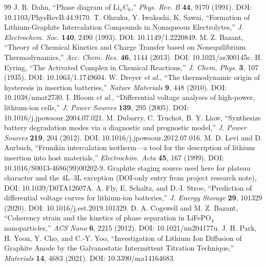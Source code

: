 \documentclass[11pt,a4paper]{article}
\begin{document}
\begin{thebibliography}{99}
 J. R. Dahn, ``Phase diagram of Li$_x$C$_6$,'' \emph{Phys. Rev. B} \textbf{44}, 9170 (1991). DOI: 10.1103/PhysRevB.44.9170.
 T. Ohzuku, Y. Iwakoshi, K. Sawai, ``Formation of Lithium-Graphite Intercalation Compounds in Nonaqueous Electrolytes,'' \emph{J. Electrochem. Soc.} \textbf{140}, 2490 (1993). DOI: 10.1149/1.2220849.
 M. Z. Bazant, ``Theory of Chemical Kinetics and Charge Transfer based on Nonequilibrium Thermodynamics,'' \emph{Acc. Chem. Res.} \textbf{46}, 1144 (2013). DOI: 10.1021/ar300145c.
 H. Eyring, ``The Activated Complex in Chemical Reactions,'' \emph{J. Chem. Phys.} \textbf{3}, 107 (1935). DOI: 10.1063/1.1749604.
 W. Dreyer \emph{et al.}, ``The thermodynamic origin of hysteresis in insertion batteries,'' \emph{Nature Materials} \textbf{9}, 448 (2010). DOI: 10.1038/nmat2730.
 I. Bloom \emph{et al.}, ``Differential voltage analyses of high-power, lithium-ion cells,'' \emph{J. Power Sources} \textbf{139}, 295 (2005). DOI: 10.1016/j.jpowsour.2004.07.021.
 M. Dubarry, C. Truchot, B. Y. Liaw, ``Synthesize battery degradation modes via a diagnostic and prognostic model,'' \emph{J. Power Sources} \textbf{219}, 204 (2012). DOI: 10.1016/j.jpowsour.2012.07.016.
 M. D. Levi and D. Aurbach, ``Frumkin intercalation isotherm---a tool for the description of lithium insertion into host materials,'' \emph{Electrochim. Acta} \textbf{45}, 167 (1999). DOI: 10.1016/S0013-4686(99)00202-9.
 Graphite staging source used here for plateau character and the 4L--3L exception (DOI-only entry from project research note), DOI: 10.1039/D0TA12607A.
 A. Fly, E. Schaltz, and D.-I. Stroe, ``Prediction of differential voltage curves for lithium-ion batteries,'' \emph{J. Energy Storage} \textbf{29}, 101329 (2020). DOI: 10.1016/j.est.2019.101329.
 D. A. Cogswell and M. Z. Bazant, ``Coherency strain and the kinetics of phase separation in LiFePO$_4$ nanoparticles,'' \emph{ACS Nano} \textbf{6}, 2215 (2012). DOI: 10.1021/nn204177u.
 J. H. Park, H. Yoon, Y. Cho, and C.-Y. Yoo, ``Investigation of Lithium Ion Diffusion of Graphite Anode by the Galvanostatic Intermittent Titration Technique,'' \emph{Materials} \textbf{14}, 4683 (2021). DOI: 10.3390/ma14164683.

\end{thebibliography}
\end{document}
